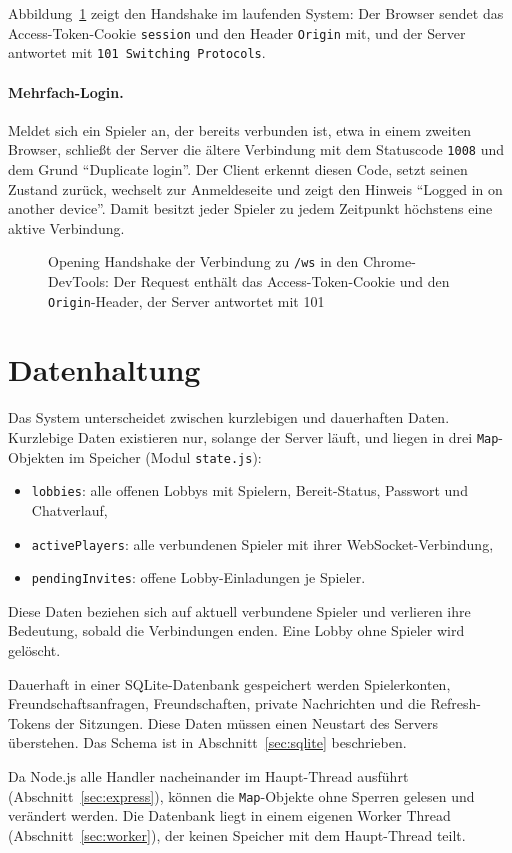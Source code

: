 Abbildung~\ref{fig:devtools-headers} zeigt den Handshake im laufenden System: Der Browser sendet das Access-Token-Cookie \texttt{session} und den Header \texttt{Origin} mit, und der Server antwortet mit \texttt{101 Switching Protocols}.

\paragraph{Mehrfach-Login.} Meldet sich ein Spieler an, der bereits verbunden ist, etwa in einem zweiten Browser, schließt der Server die ältere Verbindung mit dem Statuscode \texttt{1008} und dem Grund \enquote{Duplicate login}. Der Client erkennt diesen Code, setzt seinen Zustand zurück, wechselt zur Anmeldeseite und zeigt den Hinweis \enquote{Logged in on another device}. Damit besitzt jeder Spieler zu jedem Zeitpunkt höchstens eine aktive Verbindung.

\begin{figure}[ht]
  \centering
  \caption{Opening Handshake der Verbindung zu \texttt{/ws} in den Chrome-DevTools: Der Request enthält das Access-Token-Cookie und den \texttt{Origin}-Header, der Server antwortet mit 101}
  \label{fig:devtools-headers}
\end{figure}

\section{Datenhaltung}
\label{sec:daten}

Das System unterscheidet zwischen kurzlebigen und dauerhaften Daten. Kurzlebige Daten existieren nur, solange der Server läuft, und liegen in drei \texttt{Map}-Objekten im Speicher (Modul \texttt{state.js}):

\begin{itemize}
  \item \texttt{lobbies}: alle offenen Lobbys mit Spielern, Bereit-Status, Passwort und Chatverlauf,
  \item \texttt{activePlayers}: alle verbundenen Spieler mit ihrer WebSocket-Verbindung,
  \item \texttt{pendingInvites}: offene Lobby-Einladungen je Spieler.
\end{itemize}

Diese Daten beziehen sich auf aktuell verbundene Spieler und verlieren ihre Bedeutung, sobald die Verbindungen enden. Eine Lobby ohne Spieler wird gelöscht.

Dauerhaft in einer SQLite-Datenbank gespeichert werden Spielerkonten, Freundschaftsanfragen, Freundschaften, private Nachrichten und die Refresh-Tokens der Sitzungen. Diese Daten müssen einen Neustart des Servers überstehen. Das Schema ist in Abschnitt~\ref{sec:sqlite} beschrieben.

Da Node.js alle Handler nacheinander im Haupt-Thread ausführt (Abschnitt~\ref{sec:express}), können die \texttt{Map}-Objekte ohne Sperren gelesen und verändert werden. Die Datenbank liegt in einem eigenen Worker Thread (Abschnitt~\ref{sec:worker}), der keinen Speicher mit dem Haupt-Thread teilt.

